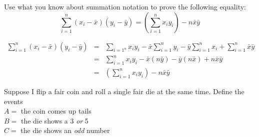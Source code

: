 \documentclass[addpoints,12pt]{exam}
\begin{document}
\begin{questions}
\question Use what you know about summation notation to prove the following equality:
  $$\sum_{i=1}^n (x_i - \bar{x}) (y_i - \bar{y}) = \left(\sum_{i=1}^n x_i y_i\right) - n\bar{x}\bar{y} $$ 
  \begin{solution}[2in]
    \begin{eqnarray*}
      \sum_{i=1}^n (x_i - \bar{x}) (y_i - \bar{y}) &=& \sum_{i=1^n}x_i y_i - \bar{x}\sum_{i=1}^n y_i - \bar{y} \sum_{i=1}^n x_i + \sum_{i=1}^n\bar{x}\bar{y}\\
      &=& \sum_{i=1}^n x_i y_i - \bar{x}(n\bar{y}) - \bar{y} (n\bar{x}) + n\bar{x}\bar{y}\\
  &=& \left(\sum_{i=1}^n x_i y_i\right) - n\bar{x}\bar{y}
    \end{eqnarray*}
  \end{solution}





\question Suppose I flip a fair coin and roll a single fair die at the same time. Define the events 
\\ $A =$ the coin comes up tails 
\\ $B =$ the die shows a 3 \emph{or} 5
\\ $C =$ the die shows an \emph{odd} number 
\end{questions}
\end{document}
